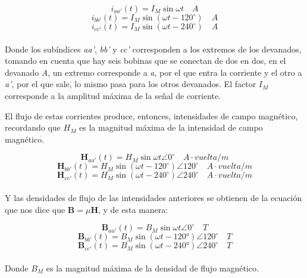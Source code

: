 \documentclass[12pt,a4paper,openany]{article}
\begin{document}
	\begin{equation*}
		i_{aa'}(t)=I_{M}\sin \omega t \quad A
	\end{equation*}
	\begin{equation*}
		i_{bb'}(t)=I_{M}\sin (\omega t - 120^{\circ}) \quad A
	\end{equation*}
	\begin{equation*}
		i_{cc'}(t)=I_{M}\sin (\omega t - 240^{\circ}) \quad A
	\end{equation*}
	\\
	Donde los subíndices \textit{aa'}, \textit{bb'} y \textit{cc'} corresponden a los extremos de los devanados, tomando en cuenta que hay seis bobinas que se conectan de dos en dos, en el devanado \textit{A}, un extremo corresponde a \textit{a}, por el que entra la corriente y el otro a \textit{a'}, por el que sale, lo mismo pasa para los otros devanados. El factor $I_M$ corresponde a la amplitud máxima de la señal de corriente.
	
	El flujo de estas corrientes produce, entonces, intensidades de campo magnético, recordando que $H_M$ es la magnitud máxima de la intensidad de campo magnético.
	
	\begin{equation*}
		\mathbf{H}_{aa'}(t)=H_{M}\sin \omega t \angle{0^{\circ}} \quad A \cdot vuelta/m
	\end{equation*}
	\begin{equation*}
		\mathbf{H}_{bb'}(t)=H_{M}\sin (\omega t - 120^{\circ}) \angle{120^{\circ}} \quad A \cdot vuelta/m
	\end{equation*}
	\begin{equation*}
		\mathbf{H}_{cc'}(t)=H_{M}\sin (\omega t - 240^{\circ})  \angle{240^{\circ}} \quad A \cdot vuelta/m
	\end{equation*}
	\\
	Y las densidades de flujo de las intensidades anteriores se obtienen de la ecuación que nos dice que $\mathbf{B}=\mu \mathbf{H}$, y de esta manera:
	
	\begin{equation*}
		\mathbf{B}_{aa'}(t)=B_{M}\sin \omega t \angle{0^{\circ}} \quad T
	\end{equation*}
	\begin{equation*}
		\mathbf{B}_{bb'}(t)=B_{M}\sin (\omega t - 120°) \angle{120^{\circ}} \quad T
	\end{equation*}
	\begin{equation*}
		\mathbf{B}_{cc'}(t)=B_{M}\sin (\omega t - 240°) \angle{240^{\circ}} \quad T
	\end{equation*}
	\\
	Donde $B_M$ es la magnitud máxima de la densidad de flujo magnético.
	
\end{document}

